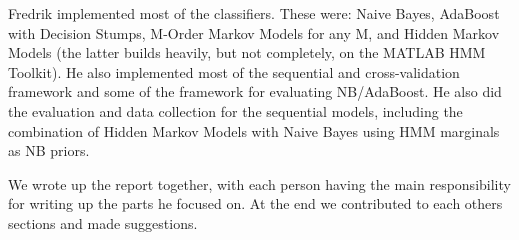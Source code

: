 \documentclass[10pt, twocolumn]{article}
\begin{document}
Fredrik implemented most of the classifiers. These were: Naive Bayes, AdaBoost with Decision Stumps, M-Order Markov Models for any M, and Hidden Markov Models (the latter builds heavily, but not completely, on the MATLAB HMM Toolkit).
He also implemented most of the sequential and cross-validation framework and some of the framework for evaluating NB/AdaBoost.
He also did the evaluation and data collection for the sequential models, including the combination of Hidden Markov Models with Naive Bayes using HMM marginals as NB priors.

We wrote up the report together, with each person having the main responsibility for writing up the parts he focused on. At the end we contributed to each others sections and made suggestions.




\end{document}
